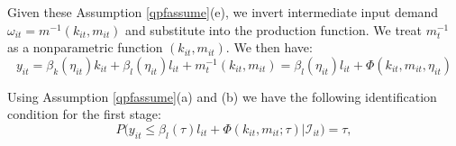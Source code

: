\documentclass[11pt]{article}
\begin{document}
Given these Assumption \eqref{qpfassume}(e), we invert intermediate input demand $\omega_{it}=m^{-1}(k_{it}, m_{it})$ and substitute into the production function. We treat $m_{t}^{-1}$ as a nonparametric function $(k_{it}, m_{it})$. We then have:
\begin{equation} \label{qpf1st}
y_{it}=\beta_{k}(\eta_{it})k_{it}+\beta_{l}(\eta_{it})l_{it}+m_{t}^{-1}(k_{it}, m_{it})=\beta_{l}(\eta_{it})l_{it}+\Phi(k_{it}, m_{it}, \eta_{it})
\end{equation}

Using Assumption \eqref{qpfassume}(a) and (b) we have the following identification condition for the first stage:
\begin{equation} \label{1ststageident}
	P\big(y_{it}\leq \beta_{l}(\tau)l_{it}+\Phi(k_{it}, m_{it}; \tau)\big|\mathcal{I}_{it})=\tau,
\end{equation}
\end{document}
